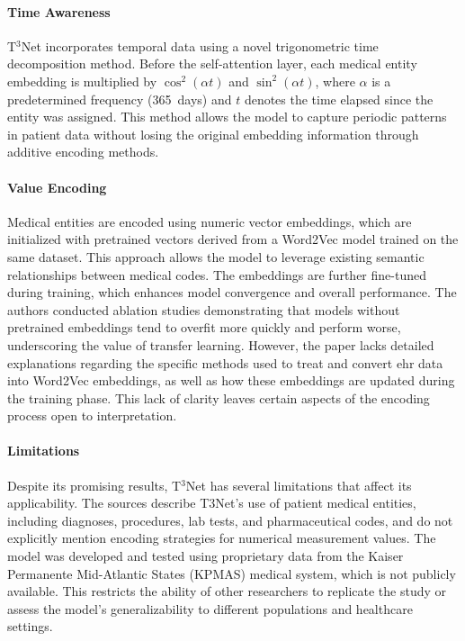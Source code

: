 \paragraph{Time Awareness}
T$^3$Net incorporates temporal data using a novel trigonometric time decomposition method. Before the self-attention layer, each medical entity embedding is multiplied by $\cos^2(\alpha t)$ and $\sin^2(\alpha t)$, where $\alpha$ is a predetermined frequency (\qty{365}{days}) and $t$ denotes the time elapsed since the entity was assigned. This method allows the model to capture periodic patterns in patient data without losing the original embedding information through additive encoding methods.

\paragraph{Value Encoding}
Medical entities are encoded using numeric vector embeddings, which are initialized with pretrained vectors derived from a Word2Vec model trained on the same dataset. This approach allows the model to leverage existing semantic relationships between medical codes. The embeddings are further fine-tuned during training, which enhances model convergence and overall performance. The authors conducted ablation studies demonstrating that models without pretrained embeddings tend to overfit more quickly and perform worse, underscoring the value of transfer learning. However, the paper lacks detailed explanations regarding the specific methods used to treat and convert \gls{ehr} data into Word2Vec embeddings, as well as how these embeddings are updated during the training phase. This lack of clarity leaves certain aspects of the encoding process open to interpretation.

\paragraph{Limitations}

Despite its promising results, T$^3$Net has several limitations that affect its applicability. The sources describe T3Net's use of patient medical entities, including diagnoses, procedures, lab tests, and pharmaceutical codes, and do not explicitly mention encoding strategies for numerical measurement values. The model was developed and tested using proprietary data from the Kaiser Permanente Mid-Atlantic States (KPMAS) medical system, which is not publicly available. This restricts the ability of other researchers to replicate the study or assess the model's generalizability to different populations and healthcare settings.

